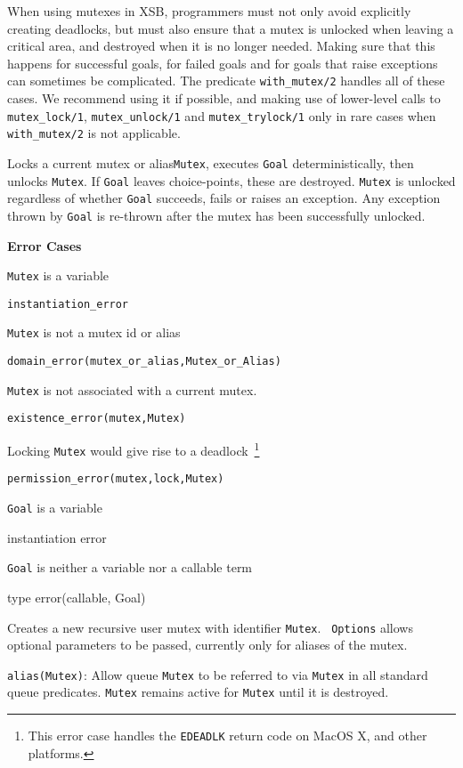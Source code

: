 When using mutexes in XSB, programmers must not only avoid explicitly
creating deadlocks, but must also ensure that a mutex is unlocked when
leaving a critical area, and destroyed when it is no longer needed.
Making sure that this happens for successful goals, for failed goals
and for goals that raise exceptions can sometimes be complicated.  The
predicate {\tt with\_mutex/2} handles all of these cases.  We
recommend using it if possible, and making use of lower-level calls to
{\tt mutex\_lock/1}, {\tt mutex\_unlock/1} and {\tt mutex\_trylock/1}
only in rare cases when {\tt with\_mutex/2} is not applicable.

\begin{description}
%
Locks a current mutex or alias{\tt Mutex}, executes {\tt Goal}
deterministically, then unlocks {\tt Mutex}.  If {\tt Goal} leaves
choice-points, these are destroyed.  {\tt Mutex} is unlocked
regardless of whether {\tt Goal} succeeds, fails or raises an
exception. Any exception thrown by {\tt Goal} is re-thrown after the
mutex has been successfully unlocked.

{\bf Error Cases}
\bi
\item 	{\tt Mutex} is a variable
\bi
\item 	{\tt instantiation\_error}
\ei
%
\item 	{\tt Mutex} is not a mutex id or alias
\bi
\item 	{\tt domain\_error(mutex\_or\_alias,Mutex\_or\_Alias)}
\ei
%
\item 	{\tt Mutex} is not associated with a current mutex.
\bi
\item 	{\tt existence\_error(mutex,Mutex)}
\ei
\item Locking {\tt Mutex} would give rise to a deadlock~\footnote{This
  error case handles the {\tt EDEADLK} return code on MacOS X, and other
  platforms.}
\bi
\item 	{\tt permission\_error(mutex,lock,Mutex)}
\ei
\item {\tt Goal} is a variable
\bi
\item  instantiation error
\ei
%
\item {\tt Goal} is neither a variable nor a callable term
\bi
\item type error(callable, Goal)
\ei
%
\ei

%
Creates a new recursive user mutex with identifier {\tt Mutex}.  {\tt
  Options} allows optional parameters to be passed, currently only for
aliases of the mutex.
%
\bi
\item {\tt alias(Mutex)}: Allow queue {\tt Mutex} to be referred to
  via {\tt Mutex} in all standard queue predicates.  {\tt Mutex}
  remains active for {\tt Mutex} until it is destroyed.
\ei


\end{description}
